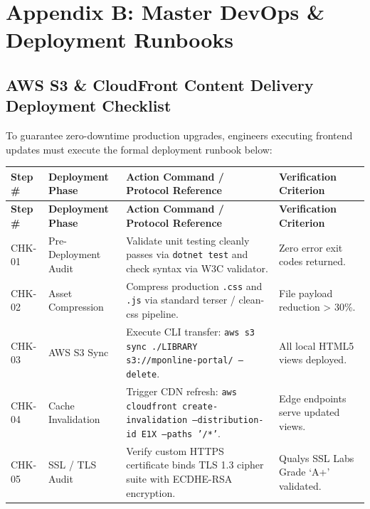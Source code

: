 \documentclass[11pt,a4paper]{report}
\begin{document}
\newpage

\chapter{Appendix B: Master DevOps \& Deployment Runbooks}

\section{AWS S3 \& CloudFront Content Delivery Deployment Checklist}
To guarantee zero-downtime production upgrades, engineers executing frontend updates must execute the formal deployment runbook below:

\vspace{10pt}
\noindent
\begin{center}
\renewcommand{\arraystretch}{1.25}
\begin{longtable}{|L{1.8cm}|L{3.6cm}|L{6.2cm}|L{3.5cm}|}
\hline
{}
\textbf{\color{white}Step \#} & \textbf{\color{white}Deployment Phase} & \textbf{\color{white}Action Command / Protocol Reference} & \textbf{\color{white}Verification Criterion} \\
\hline
\endfirsthead
\hline
{}
\textbf{\color{white}Step \#} & \textbf{\color{white}Deployment Phase} & \textbf{\color{white}Action Command / Protocol Reference} & \textbf{\color{white}Verification Criterion} \\
\hline
\endhead
CHK-01 & Pre-Deployment Audit & Validate unit testing cleanly passes via \texttt{dotnet test} and check syntax via W3C validator. & Zero error exit codes returned. \\
\hline
{}
CHK-02 & Asset Compression & Compress production \texttt{.css} and \texttt{.js} via standard terser / clean-css pipeline. & File payload reduction > 30\%. \\
\hline
CHK-03 & AWS S3 Sync & Execute CLI transfer: \texttt{aws s3 sync ./LIBRARY s3://mponline-portal/ --delete}. & All local HTML5 views deployed. \\
\hline
{}
CHK-04 & Cache Invalidation & Trigger CDN refresh: \texttt{aws cloudfront create-invalidation --distribution-id E1X --paths '/*'}. & Edge endpoints serve updated views. \\
\hline
CHK-05 & SSL / TLS Audit & Verify custom HTTPS certificate binds TLS 1.3 cipher suite with ECDHE-RSA encryption. & Qualys SSL Labs Grade `A+' validated. \\
\hline
\end{longtable}
\end{center}
\end{document}
